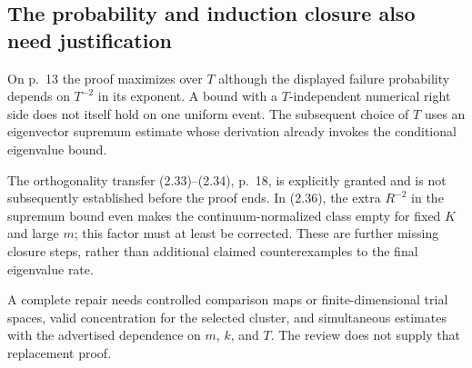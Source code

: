 \documentclass[10pt]{article}
\begin{document}
\subsection*{The probability and induction closure also need justification}
On p. 13 the proof maximizes over \(T\) although the displayed failure probability depends on \(T^{-2}\) in its exponent. A bound with a \(T\)-independent numerical right side does not itself hold on one uniform event. The subsequent choice of \(T\) uses an eigenvector supremum estimate whose derivation already invokes the conditional eigenvalue bound.\par
The orthogonality transfer (2.33)–(2.34), p. 18, is explicitly granted and is not subsequently established before the proof ends. In (2.36), the extra \(R^{-2}\) in the supremum bound even makes the continuum-normalized class empty for fixed \(K\) and large \(m\); this factor must at least be corrected. These are further missing closure steps, rather than additional claimed counterexamples to the final eigenvalue rate.\par
A complete repair needs controlled comparison maps or finite-dimensional trial spaces, valid concentration for the selected cluster, and simultaneous estimates with the advertised dependence on \(m\), \(k\), and \(T\). The review does not supply that replacement proof.\par
\end{document}
